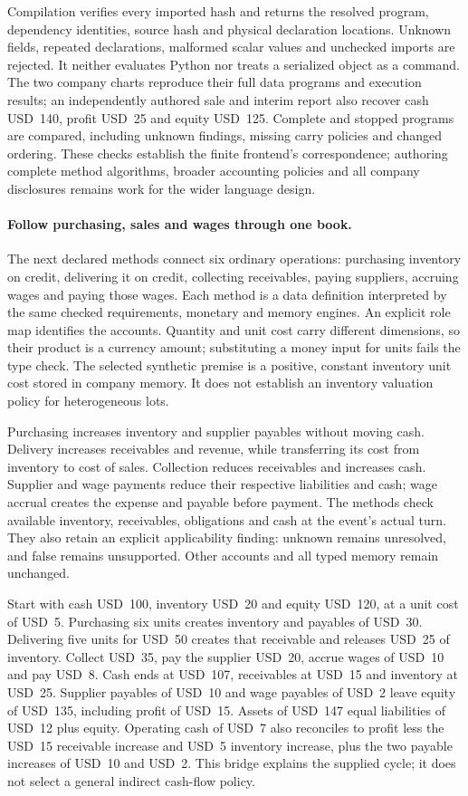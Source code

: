 Compilation verifies every imported hash and returns the resolved program,
dependency identities, source hash and physical declaration locations. Unknown
fields, repeated declarations, malformed scalar values and unchecked imports are
rejected. It neither evaluates Python nor treats a serialized object as a command.
The two company charts reproduce their full data programs and execution results;
an independently authored sale and interim report also recover cash USD~140,
profit USD~25 and equity USD~125. Complete and stopped programs are compared,
including unknown findings, missing carry policies and changed ordering. These
checks establish the finite frontend's correspondence; authoring complete method
algorithms, broader accounting policies and all company disclosures remains work
for the wider language design.


\paragraph{Follow purchasing, sales and wages through one book.}
The next declared methods connect six ordinary operations: purchasing inventory
on credit, delivering it on credit, collecting receivables, paying suppliers,
accruing wages and paying those wages. Each method is a data definition interpreted
by the same checked requirements, monetary and memory engines. An explicit role
map identifies the accounts. Quantity and unit cost carry different dimensions,
so their product is a currency amount; substituting a money input for units fails
the type check. The selected synthetic premise is a positive, constant inventory
unit cost stored in company memory. It does not establish an inventory valuation
policy for heterogeneous lots.

Purchasing increases inventory and supplier payables without moving cash.
Delivery increases receivables and revenue, while transferring its cost from
inventory to cost of sales. Collection reduces receivables and increases cash.
Supplier and wage payments reduce their respective liabilities and cash; wage
accrual creates the expense and payable before payment. The methods check available
inventory, receivables, obligations and cash at the event's actual turn. They also
retain an explicit applicability finding: unknown remains unresolved, and false
remains unsupported. Other accounts and all typed memory remain unchanged.

Start with cash USD~100, inventory USD~20 and equity USD~120, at a unit cost of
USD~5. Purchasing six units creates inventory and payables of USD~30. Delivering
five units for USD~50 creates that receivable and releases USD~25 of inventory.
Collect USD~35, pay the supplier USD~20, accrue wages of USD~10 and pay USD~8.
Cash ends at USD~107, receivables at USD~15 and inventory at USD~25. Supplier
payables of USD~10 and wage payables of USD~2 leave equity of USD~135, including
profit of USD~15. Assets of USD~147 equal liabilities of USD~12 plus equity.
Operating cash of USD~7 also reconciles to profit less the USD~15 receivable
increase and USD~5 inventory increase, plus the two payable increases of USD~10
and USD~2. This bridge explains the supplied cycle; it does not select a general
indirect cash-flow policy.

